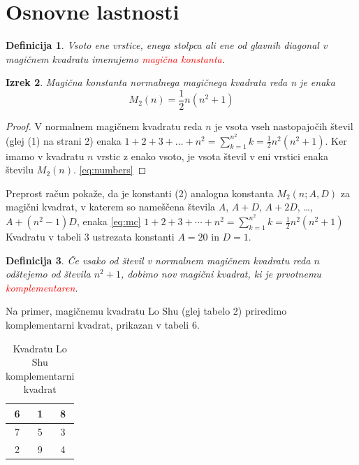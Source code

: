 \documentclass[a4paper,12pt]{article}
\newtheorem{izrek}{Izrek}[section]
\newtheorem{definicija}[izrek]{Definicija}
\begin{document}
\section{Osnovne lastnosti}

\begin{definicija}
      Vsoto ene vrstice, enega stolpca ali ene od glavnih diagonal
      v magičnem kvadratu imenujemo \textcolor{red}{\emph{magična konstanta}}.
\end{definicija}


\begin{izrek}
   
      Magična konstanta normalnega magičnega kvadrata reda n
      je enaka
      \begin{equation}
         \label{eq:mc}
         M_2(n) = \frac{1}{2} n(n^2+1)
      \end{equation}
\end{izrek}



\begin{proof}
   
      V normalnem magičnem kvadratu reda $n$ je vsota vseh nastopajočih
      števil (glej (1) na strani 2) enaka
      $1+2+3+\dots+n^2=\sum_{k=1}^{n^2}k=\frac{1}{2}n^2(n^2+1)$. Ker imamo
      v kvadratu $n$ vrstic z enako vsoto, je vsota števil v eni vrstici
      enaka številu $M_2(n)$. \eqref{eq:numbers}
\end{proof}


Preprost račun pokaže, da je konstanti (2) analogna konstanta
$M_2(n;A,D)$ za magični kvadrat, v katerem so nameščena števila
$A$, $A+D$, $A+2D$, \dots, $A+(n^2-1)D$, enaka \eqref{eq:mc}
$1 + 2 + 3 + \cdots + n^2 = \sum_{k=1}^{n^2} k = \frac{1}{2} n^2 (n^2 + 1)$
Kvadratu v tabeli 3 ustrezata konstanti $A=20$ in $D=1$.

\begin{definicija}
      Če vsako od števil v normalnem magičnem kvadratu reda $n$ odštejemo
      od števila $n^2+1$, dobimo nov magični kvadrat, ki je prvotnemu
      \textcolor{red}{\emph{komplementaren}}.
\end{definicija}

Na primer, magičnemu kvadratu Lo Shu (glej tabelo 2) priredimo
komplementarni kvadrat, prikazan v tabeli 6.

\begin{table}[h]
\centering
\large
\caption{Kvadratu Lo Shu komplementarni kvadrat}
   \begin{tabular}{|c|c|c|}
      \hline
      6 & 1 & 8 \\\hline
      7 & 5 & 3 \\\hline
      2 & 9 & 4 \\\hline
   \end{tabular}
   \label{table:closhu}
\end{table}
\end{document}
